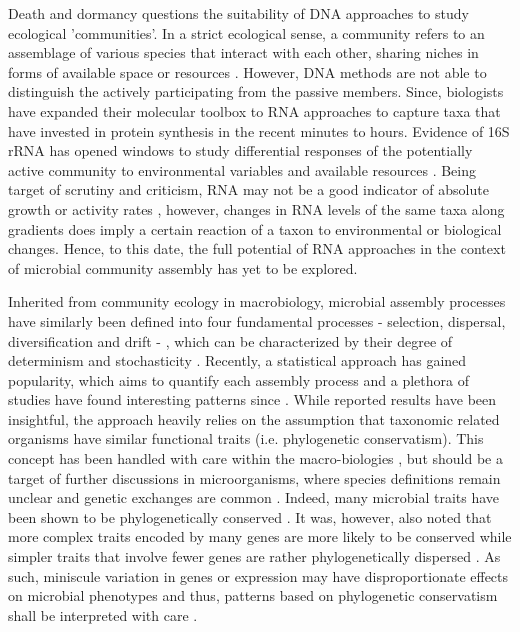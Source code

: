 \documentclass[12pt,a4paper]{article} %
\begin{document}
Death and dormancy \citep{Cole1999, Jones2010} questions the suitability of DNA approaches to study ecological 'communities'. In a strict ecological sense, a community refers to an assemblage of various species that interact with each other, sharing niches in forms of available space or resources \citep{Konopka2009}. However, DNA methods are not able to distinguish the actively participating from the passive members. Since, biologists have expanded their molecular toolbox to RNA approaches to capture taxa that have invested in protein synthesis in the recent minutes to hours. Evidence of 16S rRNA has opened windows to study differential responses of the potentially active community to environmental variables \citep{Campbell2013, Wisnoski2020} and available resources \citep{Osterholz2016}. Being target of scrutiny and criticism, RNA may not be a good indicator of absolute growth or activity rates \citep{Blazewicz2013}, however, changes in RNA levels of the same taxa along gradients does imply a certain reaction of a taxon to environmental or biological changes. Hence, to this date, the full potential of RNA approaches in the context of microbial community assembly has yet to be explored.

Inherited from community ecology in macrobiology, microbial assembly processes have similarly been defined into four fundamental processes - selection, dispersal, diversification and drift - \citep{Vellend2010}, which can be characterized by their degree of determinism and stochasticity \citep{Zhou2017}. Recently, a statistical approach has gained popularity, which aims to quantify each assembly process \citep{Stegen2013a, Stegen2015a} and a plethora of studies have found interesting patterns since \citep{Gweon2020, Langenheder2017, Graham2017a}. While reported results have been insightful, the approach heavily relies on the assumption that taxonomic related organisms have similar functional traits (i.e. phylogenetic conservatism). This concept has been handled with care within the macro-biologies \citep{Losos2008, Warren2008}, but should be a target of further discussions in microorganisms, where species definitions remain unclear \citep{Achtman2008} and genetic exchanges are common \citep{Thomas2005}. Indeed, many microbial traits have been shown to be phylogenetically conserved \citep{Martiny2015}. It was, however, also noted that more complex traits encoded by many genes are more likely to be conserved while simpler traits that involve fewer genes are rather phylogenetically dispersed \citep{Martiny2013a}. As such, miniscule variation in genes \citep{Forslund2014} or expression \citep{Caumette2015} may have disproportionate effects on microbial phenotypes and thus, patterns based on phylogenetic conservatism shall be interpreted with care \citep{Achtman2008, Ackermann2015, Chase2018}.
\end{document}
